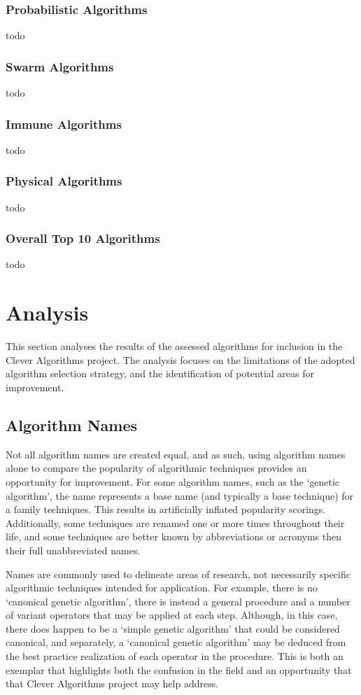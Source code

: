 \documentclass[a4paper, 11pt]{article}
\begin{document}
\subsubsection{Probabilistic Algorithms}
todo

\subsubsection{Swarm Algorithms}
todo

\subsubsection{Immune Algorithms}
todo

\subsubsection{Physical Algorithms}
todo

\subsubsection{Overall Top 10 Algorithms}
todo

% 
% 
\section{Analysis}
\label{sec:analysis}
This section analyses the results of the assessed algorithms for inclusion in the Clever Algorithms project. The analysis focuses on the limitations of the adopted algorithm selection strategy, and the identification of potential areas for improvement.

\subsection{Algorithm Names}
Not all algorithm names are created equal, and as such, using algorithm names alone to compare the popularity of algorithmic techniques provides an opportunity for improvement. For some algorithm names, such as the `genetic algorithm', the name represents a base name (and typically a base technique) for a family techniques. This results in artificially inflated popularity scorings. Additionally, some techniques are renamed one or more times throughout their life, and some techniques are better known by abbreviations or acronyms then their full unabbreviated names.

Names are commonly used to delineate areas of research, not necessarily specific algorithmic techniques intended for application. For example, there is no `canonical genetic algorithm', there is instead a general procedure and a number of variant operators that may be applied at each step. Although, in this case, there does happen to be a `simple genetic algorithm' that could be considered canonical, and separately, a `canonical genetic algorithm' may be deduced from the best practice realization of each operator in the procedure. This is both an exemplar that highlights both the confusion in the field and an opportunity that that Clever Algorithms project may help address.
\end{document}
